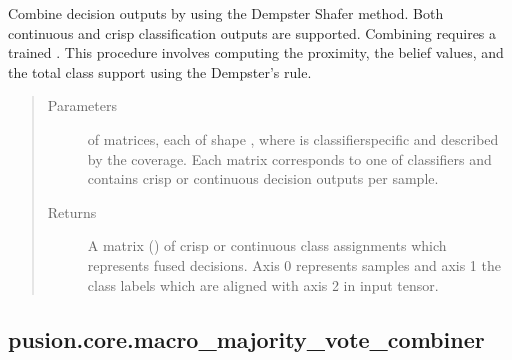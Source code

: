 \documentclass[letterpaper,10pt,english]{sphinxmanual}
\begin{document}
\begin{fulllineitems}
\begin{fulllineitems}
\label{\detokenize{pusion.core.dempster_shafer_combiner:pusion.core.dempster_shafer_combiner.CRDempsterShaferCombiner.combine}}
\sphinxAtStartPar
Combine decision outputs by using the Dempster Shafer method.
Both continuous and crisp classification outputs are supported. Combining requires a trained
{\hyperref[\detokenize{pusion.core.dempster_shafer_combiner:pusion.core.dempster_shafer_combiner.DempsterShaferCombiner}]{}}.
This procedure involves computing the proximity, the belief values, and the total class support using the
Dempster’s rule.
\begin{quote}\begin{description}
\item[{Parameters}] \leavevmode
\sphinxAtStartPar
{} \textendash{}  of  matrices, each of shape ,
where  is classifier\sphinxhyphen{}specific and described by the coverage. Each matrix corresponds to
one of  classifiers and contains crisp or continuous decision outputs per sample.

\item[{Returns}] \leavevmode
\sphinxAtStartPar
A matrix () of crisp or continuous class assignments which represents fused decisions.
Axis 0 represents samples and axis 1 the class labels which are aligned with axis 2 in
 input tensor.

\end{description}\end{quote}

\end{fulllineitems}


\end{fulllineitems}



\subsection{pusion.core.macro\_majority\_vote\_combiner}
\label{\detokenize{pusion.core.macro_majority_vote_combiner:module-pusion.core.macro_majority_vote_combiner}}\label{\detokenize{pusion.core.macro_majority_vote_combiner:pusion-core-macro-majority-vote-combiner}}\label{\detokenize{pusion.core.macro_majority_vote_combiner:mamv-cref}}\label{\detokenize{pusion.core.macro_majority_vote_combiner::doc}}
\end{document}

